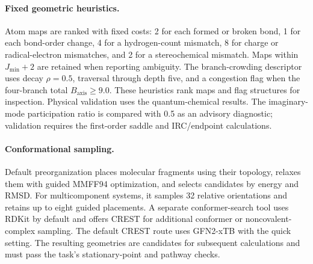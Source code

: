 \paragraph{Fixed geometric heuristics.}
Atom maps are ranked with fixed costs: 2 for each formed or broken bond, 1 for each bond-order change, 4 for a hydrogen-count mismatch, 8 for charge or radical-electron mismatches, and 2 for a stereochemical mismatch. Maps within $J_{\min}+2$ are retained when reporting ambiguity. The branch-crowding descriptor uses decay $\rho=0.5$, traversal through depth five, and a congestion flag when the four-branch total $B_{\mathrm{axis}}\geq9.0$. These heuristics rank maps and flag structures for inspection. Physical validation uses the quantum-chemical results. The imaginary-mode participation ratio is compared with 0.5 as an advisory diagnostic; validation requires the first-order saddle and IRC/endpoint calculations.

\paragraph{Conformational sampling.}
Default preorganization places molecular fragments using their topology, relaxes them with guided MMFF94 optimization, and selects candidates by energy and RMSD. For multicomponent systems, it samples 32 relative orientations and retains up to eight guided placements. A separate conformer-search tool uses RDKit by default and offers CREST\citep{crest2020} for additional conformer or noncovalent-complex sampling. The default CREST route uses GFN2-xTB with the quick setting. The resulting geometries are candidates for subsequent calculations and must pass the task's stationary-point and pathway checks.

